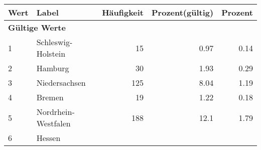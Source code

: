      \begin{longtable}{lXrrr}
     \toprule
     \textbf{Wert} & \textbf{Label} & \textbf{Häufigkeit} & \textbf{Prozent(gültig)} & \textbf{Prozent} \\
     \endhead
     \midrule
     \multicolumn{5}{l}{\textbf{Gültige Werte}}\\

     1 &
     \multicolumn{1}{X}{ Schleswig-Holstein   } &


       \num{15} &
       \num[round-mode=places,round-precision=2]{0,97} &
         \num[round-mode=places,round-precision=2]{0,14} \\

     2 &
     \multicolumn{1}{X}{ Hamburg   } &


       \num{30} &
       \num[round-mode=places,round-precision=2]{1,93} &
         \num[round-mode=places,round-precision=2]{0,29} \\

     3 &
     \multicolumn{1}{X}{ Niedersachsen   } &


       \num{125} &
       \num[round-mode=places,round-precision=2]{8,04} &
         \num[round-mode=places,round-precision=2]{1,19} \\

     4 &
     \multicolumn{1}{X}{ Bremen   } &


       \num{19} &
       \num[round-mode=places,round-precision=2]{1,22} &
         \num[round-mode=places,round-precision=2]{0,18} \\

     5 &
     \multicolumn{1}{X}{ Nordrhein-Westfalen   } &


       \num{188} &
       \num[round-mode=places,round-precision=2]{12,1} &
         \num[round-mode=places,round-precision=2]{1,79} \\

     6 &
     \multicolumn{1}{X}{ Hessen   } &



\end{longtable}
